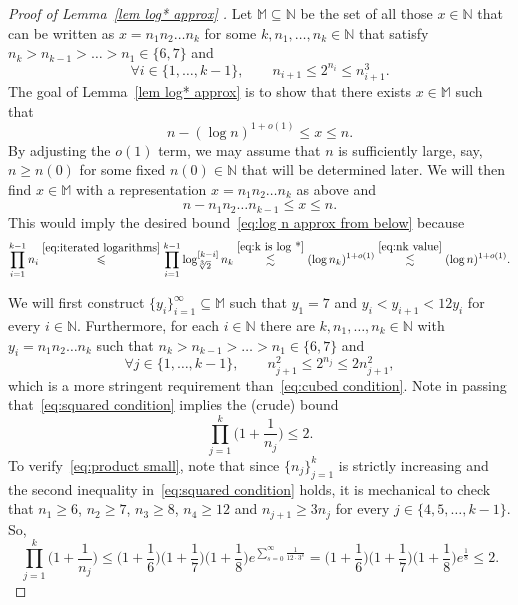 \documentclass[11pt,reqno]{amsart}
\renewcommand{\le}{\leqslant}
\renewcommand{\ge}{\geqslant}
\theoremstyle{remark}
\renewcommand{\subset}{\subseteq}
\newcommand{\N}{\mathbb N}
\renewcommand{\1}{\mathbf 1}
\begin{document}
\begin{proof}[Proof of Lemma~\ref{lem log* approx} ]  Let $\mathbb{M}\subset \N$ be the set of all those $x\in \N$ that can be written as $x=n_1n_2\ldots n_k$ for some $k,n_1,\ldots,n_k\in \N$ that satisfy $n_k>n_{k-1}>\ldots> n_1\in \{6,7\}$ and
\begin{equation}\label{eq:cubed condition}
\forall i\in \{1,\ldots,k-1\},\qquad n_{i+1}\le 2^{n_i}\le n_{i+1}^3.
\end{equation}
The goal of Lemma~\ref{lem log* approx} is to show that there exists $x\in \mathbb{M}$ such that
\begin{equation}\label{eq:log n approx from below}
n-(\log n)^{1+o(1)}\le x\le n.
\end{equation}
By adjusting the $o(1)$ term, we may assume that $n$ is sufficiently large, say, $n\ge n(0)$ for some fixed $n(0)\in \N$ that will be determined later. We will then find $x\in \mathbb{M}$ with a representation $x=n_1n_2\ldots n_k$ as above and
\begin{equation}\label{eq:product error term form}
n-n_1n_2\ldots n_{k-1}\le x\le n.
\end{equation}
This would imply the desired bound~\eqref{eq:log n approx from below} because
\begin{equation}\label{eq:product of first k-1}
\prod_{i=1}^{k-1}n_i\stackrel{\eqref{eq:iterated logarithms}}{\le} \prod_{i=1}^{k-1} \log_{\sqrt[3]{2}}^{[k-i]}n_k\stackrel{\eqref{eq:k is log *}}{\lesssim} (\log n_k)^{1+o(1)} \stackrel{\eqref{eq:nk value}}{\lesssim} (\log n)^{1+o(1)}.
\end{equation}


We will first construct $\{y_i\}_{i=1}^\infty\subset \mathbb{M}$ such that $y_1=7$ and $y_i<y_{i+1}<12y_i$ for every $i\in \N$. Furthermore, for each $i\in \N$ there are $k,n_1,\ldots,n_k\in \N$ with $y_i=n_1n_2\ldots n_k$ such that $n_k>n_{k-1}>\ldots> n_1\in \{6,7\}$ and
\begin{equation}\label{eq:squared condition}
\forall j\in \{1,\ldots,k-1\},\qquad n_{j+1}^2 \le 2^{n_j}\le 2n_{j+1}^2,
\end{equation}
which is a more stringent requirement than~\eqref{eq:cubed condition}. Note in passing that~\eqref{eq:squared condition} implies the (crude) bound
\begin{equation}\label{eq:product small}
\prod_{j=1}^k \Big(1+\frac{1}{n_j}\Big)\le 2.
\end{equation}
To verify~\eqref{eq:product small}, note that since $\{n_j\}_{j=1}^k$ is strictly increasing and the  second inequality in~\eqref{eq:squared condition} holds, it is mechanical to check that $n_1\ge 6$, $n_2\ge 7$, $n_3\ge 8$, $n_4\ge 12$ and $n_{j+1}\ge 3 n_j$ for every $j\in \{4,5,\ldots,k-1\}$. So,
$$
\prod_{j=1}^k \Big(1+\frac{1}{n_j}\Big)\le \Big(1+\frac{1}{6}\Big)\Big(1+\frac{1}{7}\Big)\Big(1+\frac{1}{8}\Big)e^{\sum_{s=0}^\infty \frac{1}{12\cdot 3^s}}=\Big(1+\frac{1}{6}\Big)\Big(1+\frac{1}{7}\Big)\Big(1+\frac{1}{8}\Big)e^{\frac18}\le 2.
$$



\end{proof}
\end{document}
